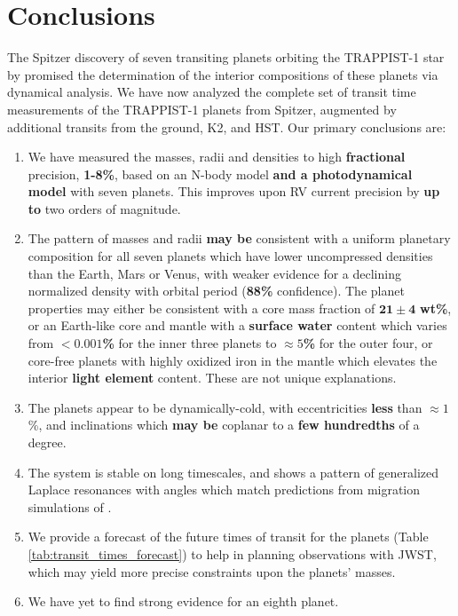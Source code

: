 \documentclass[twocolumn]{aastex63}
\begin{document}
\section{Conclusions} \label{sec:conclusions}

The Spitzer discovery of seven transiting planets orbiting the TRAPPIST-1 star by \citet{Gillon2017} promised the determination of the interior compositions of these planets via dynamical analysis.
We have now analyzed the complete set of transit time measurements
of the TRAPPIST-1 planets from  Spitzer, augmented by
additional transits from the ground, K2, and HST.  Our primary conclusions
are:

\begin{enumerate}
    \item  We have measured the masses, radii and densities to high \textbf{fractional} precision, \textbf{1-8\%}, based on an N-body model \textbf{and a photodynamical model} with seven planets.  This improves upon RV current precision by \textbf{up to} two orders of magnitude.
    \item  The pattern of masses and radii \textbf{may be} consistent with a uniform planetary composition for all seven planets
          which have lower uncompressed densities than the Earth, Mars or Venus, with weaker evidence for a declining normalized density with orbital period (\textbf{88\%} confidence). The planet properties may either be consistent with
          a core mass fraction of $\mathbf{21{\pm}4}$ \textbf{wt\%}, or an Earth-like core and mantle with a \textbf{surface water}
          content which varies from \textbf{${<}0.001$\%} for the inner three planets to \textbf{${\approx} 5$\%}
          for the outer four, or core-free planets with highly oxidized iron in the mantle which elevates the interior \textbf{light element} content.  These are not unique explanations.
    \item  The planets appear to be dynamically-cold, with eccentricities \textbf{less} than
          ${\approx }1$\%, and inclinations which \textbf{may be} coplanar to a \textbf{few hundredths} of a degree.
    \item The system is stable on long timescales, and shows a pattern of generalized Laplace resonances with angles which match predictions from migration simulations of \citet{Mah2018}.
    \item We provide a forecast of the future times of transit for the planets (Table \ref{tab:transit_times_forecast}) to help in planning observations with JWST, which may yield more precise constraints upon the planets' masses.
    \item We have yet to find strong evidence for an eighth planet.
\end{enumerate}
\end{document}
